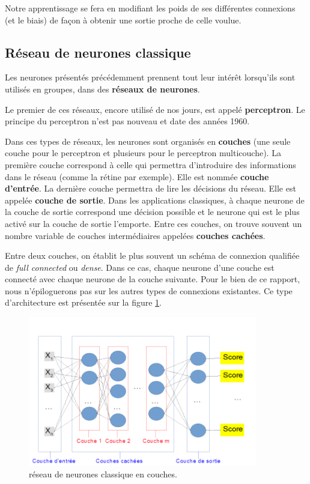 Notre apprentissage se fera en modifiant les poids de ses différentes
connexions (et le biais) de façon à obtenir une sortie proche de celle voulue.

\hypertarget{Ruxe9seau-de-neurones-classique}{%
\subsection{Réseau de neurones classique}
\label{Ruxe9seau-de-neurones-classique}}

Les neurones présentés précédemment prennent tout leur intérêt lorsqu'ils sont utilisés en groupes, dans des \textbf{réseaux de neurones}.

Le premier de ces réseaux, encore utilisé de nos jours, est appelé \textbf{perceptron}.
Le principe du perceptron n'est pas nouveau et date des années 1960.

Dans ces types de réseaux, les neurones sont organisés en \textbf{couches} (une seule couche pour le perceptron et plusieurs pour le perceptron multicouche).
La première couche correspond à celle qui permettra d'introduire des informations dans le réseau (comme la rétine par exemple). Elle est nommée \textbf{couche d'entrée}.
La dernière couche permettra de lire les décisions du réseau. Elle est appelée \textbf{couche de sortie}. Dans les applications classiques, à chaque neurone de la couche de sortie correspond une décision possible et le neurone qui est le plus activé sur la couche de sortie l'emporte.
Entre ces couches, on trouve souvent un nombre variable de couches intermédiaires appelées \textbf{couches cachées}.

Entre deux couches, on établit le plus souvent un schéma de connexion qualifiée
de \textit{full connected} ou \textit{dense}.
Dans ce cas, chaque neurone d'une couche est connecté avec chaque neurone de la
couche suivante. Pour le bien de ce rapport, nous n'épiloguerons pas sur les autres
types de connexions existantes. Ce type d'architecture est présentée sur la figure \ref{reseauClassique}.

\begin{figure}[h]
\centering
\includegraphics[width=10cm]{./images/multicouche.png}
\caption{réseau de neurones classique en couches.%
\label{reseauClassique}}
\end{figure}


